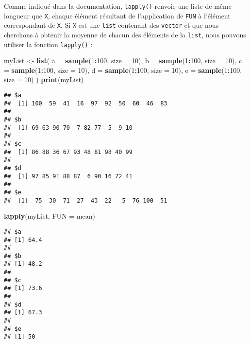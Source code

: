\documentclass[]{book}
\newenvironment{Shaded}{\begin{snugshade}}{\end{snugshade}}
\newcommand{\KeywordTok}[1]{\textcolor[rgb]{0.13,0.29,0.53}{\textbf{#1}}}
\newcommand{\DataTypeTok}[1]{\textcolor[rgb]{0.13,0.29,0.53}{#1}}
\newcommand{\DecValTok}[1]{\textcolor[rgb]{0.00,0.00,0.81}{#1}}
\newcommand{\StringTok}[1]{\textcolor[rgb]{0.31,0.60,0.02}{#1}}
\newcommand{\OperatorTok}[1]{\textcolor[rgb]{0.81,0.36,0.00}{\textbf{#1}}}
\newcommand{\NormalTok}[1]{#1}
\theoremstyle{definition}
\theoremstyle{definition}
\theoremstyle{definition}
\theoremstyle{remark}
\begin{document}
Comme indiqué dans la documentation, \texttt{lapply()} renvoie une liste
de même longueur que \texttt{X}, chaque élément résultant de
l'application de \texttt{FUN} à l'élément correspondant de \texttt{X}.
Si \texttt{X} est une \texttt{list} contenant des \texttt{vector} et que
nous cherchons à obtenir la moyenne de chacun des éléments de la
\texttt{list}, nous pouvons utiliser la fonction \texttt{lapply()} :

\begin{Shaded}
\begin{Highlighting}[]
\NormalTok{myList <-}\StringTok{ }\KeywordTok{list}\NormalTok{(}
  \DataTypeTok{a =} \KeywordTok{sample}\NormalTok{(}\DecValTok{1}\OperatorTok{:}\DecValTok{100}\NormalTok{, }\DataTypeTok{size =} \DecValTok{10}\NormalTok{), }
  \DataTypeTok{b =} \KeywordTok{sample}\NormalTok{(}\DecValTok{1}\OperatorTok{:}\DecValTok{100}\NormalTok{, }\DataTypeTok{size =} \DecValTok{10}\NormalTok{), }
  \DataTypeTok{c =} \KeywordTok{sample}\NormalTok{(}\DecValTok{1}\OperatorTok{:}\DecValTok{100}\NormalTok{, }\DataTypeTok{size =} \DecValTok{10}\NormalTok{), }
  \DataTypeTok{d =} \KeywordTok{sample}\NormalTok{(}\DecValTok{1}\OperatorTok{:}\DecValTok{100}\NormalTok{, }\DataTypeTok{size =} \DecValTok{10}\NormalTok{), }
  \DataTypeTok{e =} \KeywordTok{sample}\NormalTok{(}\DecValTok{1}\OperatorTok{:}\DecValTok{100}\NormalTok{, }\DataTypeTok{size =} \DecValTok{10}\NormalTok{)}
\NormalTok{)}
\KeywordTok{print}\NormalTok{(myList)}
\end{Highlighting}
\end{Shaded}

\begin{verbatim}
## $a
##  [1] 100  59  41  16  97  92  50  60  46  83
## 
## $b
##  [1] 69 63 90 70  7 82 77  5  9 10
## 
## $c
##  [1] 86 88 36 67 93 48 81 98 40 99
## 
## $d
##  [1] 97 85 91 88 87  6 90 16 72 41
## 
## $e
##  [1]  75  30  71  27  43  22   5  76 100  51
\end{verbatim}

\begin{Shaded}
\begin{Highlighting}[]
\KeywordTok{lapply}\NormalTok{(myList, }\DataTypeTok{FUN =}\NormalTok{ mean)}
\end{Highlighting}
\end{Shaded}

\begin{verbatim}
## $a
## [1] 64.4
## 
## $b
## [1] 48.2
## 
## $c
## [1] 73.6
## 
## $d
## [1] 67.3
## 
## $e
## [1] 50
\end{verbatim}
\end{document}
